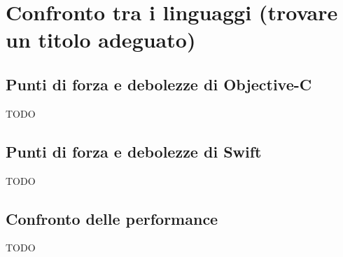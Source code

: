 \chapter{Confronto tra i linguaggi (trovare un titolo adeguato)}

\section{Punti di forza e debolezze di Objective-C}
TODO
\section{Punti di forza e debolezze di Swift}
TODO
\section{Confronto delle performance }
TODO
